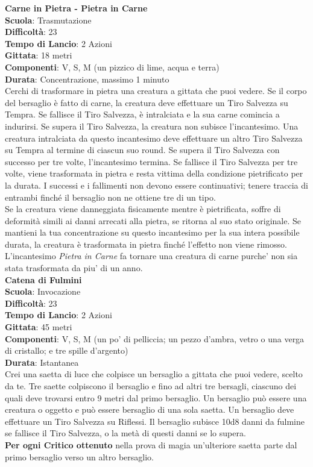 \begin{multicols}{2}
\medskip\textbf{Carne in Pietra - Pietra in Carne}\\
\textbf{Scuola}: Trasmutazione\\
\textbf{Difficoltà}:  23\\
\textbf{Tempo di Lancio}: 2 Azioni\\
\textbf{Gittata}: 18 metri\\
\textbf{Componenti}: V, S, M (un pizzico di lime, acqua e terra)\\
\textbf{Durata}: Concentrazione, massimo 1 minuto\\
Cerchi di trasformare in pietra una creatura a gittata che puoi vedere. Se il corpo del bersaglio è fatto di carne, la creatura deve effettuare un Tiro Salvezza su Tempra. Se fallisce il Tiro Salvezza, è intralciata e la sua carne comincia a indurirsi. Se supera il Tiro Salvezza, la creatura non subisce l'incantesimo. Una creatura intralciata da questo incantesimo deve effettuare un altro Tiro Salvezza su Tempra al termine di ciascun suo round. Se supera il Tiro Salvezza con successo per tre volte, l'incantesimo termina. Se fallisce il Tiro Salvezza per tre volte, viene trasformata in pietra e resta vittima della condizione pietrificato per la durata. I successi e i fallimenti non devono essere continuativi; tenere traccia di entrambi finché il bersaglio non ne ottiene tre di un tipo.\\
Se la creatura viene danneggiata fisicamente mentre è pietrificata, soffre di deformità simili ai danni arrecati alla pietra, se ritorna al suo stato originale. Se mantieni la tua concentrazione su questo incantesimo per la sua intera possibile durata, la creatura è trasformata in pietra finché l’effetto non viene rimosso.\\
L'incantesimo \emph{Pietra in Carne} fa tornare una creatura di carne purche' non sia stata trasformata da piu' di un anno.\\


\medskip\textbf{Catena di Fulmini}\\
\textbf{Scuola}: Invocazione\\
\textbf{Difficoltà}:  23\\
\textbf{Tempo di Lancio}: 2 Azioni\\
\textbf{Gittata}: 45 metri\\
\textbf{Componenti}: V, S, M (un po’ di pelliccia; un pezzo d’ambra, vetro o una verga di cristallo; e tre spille d’argento)\\
\textbf{Durata}: Istantanea\\
Crei una saetta di luce che colpisce un bersaglio a gittata che puoi vedere, scelto da te. Tre saette colpiscono il bersaglio e fino ad altri tre bersagli, ciascuno dei quali deve trovarsi entro 9 metri dal primo bersaglio. Un bersaglio può essere una creatura o oggetto e può essere bersaglio di una sola saetta. Un bersaglio deve effettuare un Tiro Salvezza su Riflessi. Il bersaglio subisce 10d8 danni da fulmine se fallisce il Tiro Salvezza, o la metà di questi danni se lo supera.\\
\textbf{Per ogni Critico ottenuto} nella prova di magia un'ulteriore saetta parte dal primo bersaglio verso un altro bersaglio.


\end{multicols}
